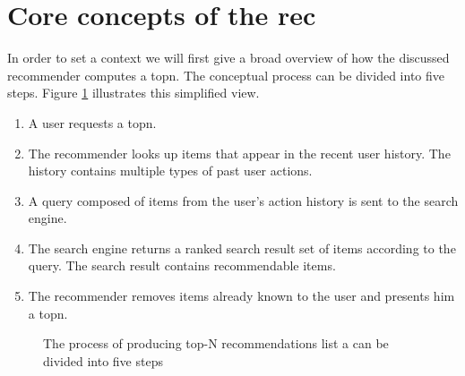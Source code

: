 \section{Core concepts of the \gls{rec}}
\label{sec:design}

In order to set a context we will first give a broad overview of how the discussed recommender computes a \gls{topn}.
The conceptual process can be divided into five steps. Figure \ref{fig:topndataflow} illustrates this simplified view.

\begin{enumerate}
\item A user requests a \gls{topn}.
\item The recommender looks up items that appear in the recent user history. The history contains multiple types of past user actions.
\item A query composed of items from the user's action history is sent to the search engine.
\item The search engine returns a ranked search result set of items according to the query. The search result contains recommendable items.
\item The recommender removes items already known to the user and presents him a \gls{topn}.
\end{enumerate}


\begin{figure}
  \centering
  \caption{The process of producing top-N recommendations list a can be divided into five steps}
  \label{fig:topndataflow}
\end{figure}

